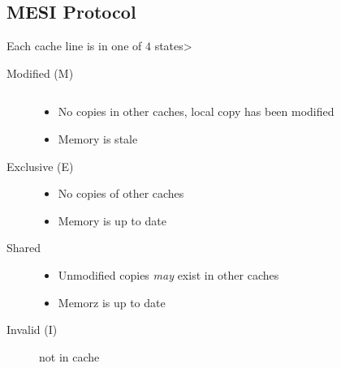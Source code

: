 \subsection{MESI Protocol}
Each cache line is in one of $4$ states>
\begin{description}
	\item[Modified (M)] $\text{}$
		\begin{itemize}
			\item No copies in other caches, local copy has been modified
			\item Memory is stale
		\end{itemize}
	\item[Exclusive (E)]
		\begin{itemize}
			\item No copies of other caches
			\item Memory is up to date
		\end{itemize}
	\item[Shared]
		\begin{itemize}
			\item Unmodified copies \emph{may} exist in other caches
			\item Memorz is up to date
		\end{itemize}

	\item[Invalid (I)] not in cache
\end{description}


